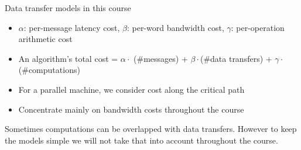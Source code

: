 \documentclass[
	12pt, %
]{beamer}
\begin{document}
\begin{frame}{Data transfer models in this course}
\begin{minipage}{0.45\linewidth}
\begin{center}
\begin{figure}
			
		\end{figure}
	\end{center}
\end{minipage}
\vfill
\begin{itemize}
	\item $\alpha$: per-message latency cost, $\beta$: per-word bandwidth cost, $\gamma$: per-operation arithmetic cost
	\item An algorithm's total cost = $\alpha \cdot$ (\#messages) + $\beta\cdot$(\#data transfers) + $\gamma \cdot$ (\#computations)
	\item For a parallel machine, we consider cost along the critical path
	\item Concentrate mainly on bandwidth costs throughout the course
\end{itemize}
\vfill
{\footnotesize Sometimes computations can be overlapped with data transfers. However to keep the models simple we will not take that into account throughout the course.} 

\end{frame}
\end{document}
